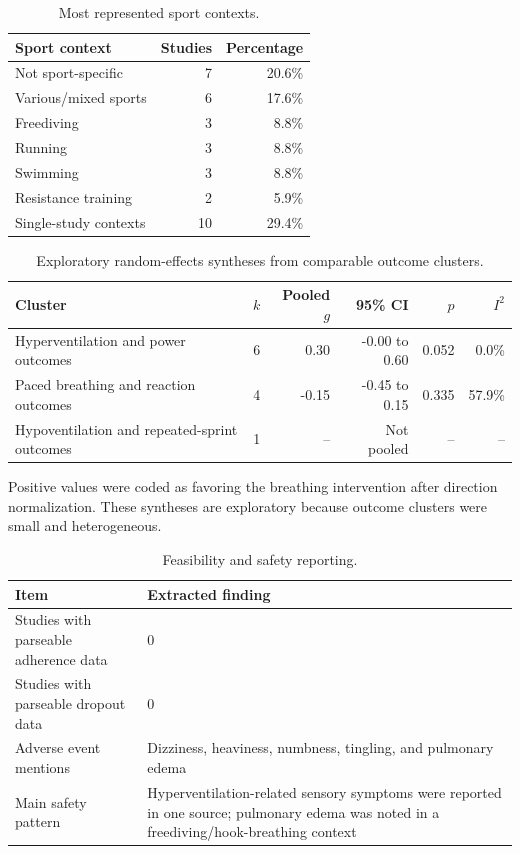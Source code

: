 \begin{table}[tbp]
\centering
\caption{Most represented sport contexts.}
\label{tab:sports}
\begin{tabular}{@{}lrr@{}}
\toprule
Sport context & Studies & Percentage \\
\midrule
Not sport-specific & 7 & 20.6\% \\
Various/mixed sports & 6 & 17.6\% \\
Freediving & 3 & 8.8\% \\
Running & 3 & 8.8\% \\
Swimming & 3 & 8.8\% \\
Resistance training & 2 & 5.9\% \\
Single-study contexts & 10 & 29.4\% \\
\bottomrule
\end{tabular}
\end{table}

\begin{table}[tbp]
\centering
\caption{Exploratory random-effects syntheses from comparable outcome clusters.}
\label{tab:meta}
\begin{tabular}{@{}lrrrrr@{}}
\toprule
Cluster & $k$ & Pooled $g$ & 95\% CI & $p$ & $I^2$ \\
\midrule
Hyperventilation and power outcomes & 6 & 0.30 & -0.00 to 0.60 & 0.052 & 0.0\% \\
Paced breathing and reaction outcomes & 4 & -0.15 & -0.45 to 0.15 & 0.335 & 57.9\% \\
Hypoventilation and repeated-sprint outcomes & 1 & -- & Not pooled & -- & -- \\
\bottomrule
\end{tabular}

\vspace{1mm}
\parbox{0.92\textwidth}{\footnotesize Positive values were coded as favoring the breathing intervention after direction normalization. These syntheses are exploratory because outcome clusters were small and heterogeneous.}
\end{table}

\begin{table}[tbp]
\centering
\caption{Feasibility and safety reporting.}
\label{tab:feasibility}
\begin{tabularx}{\textwidth}{@{}lX@{}}
\toprule
Item & Extracted finding \\
\midrule
Studies with parseable adherence data & 0 \\
Studies with parseable dropout data & 0 \\
Adverse event mentions & Dizziness, heaviness, numbness, tingling, and pulmonary edema \\
Main safety pattern & Hyperventilation-related sensory symptoms were reported in one source; pulmonary edema was noted in a freediving/hook-breathing context \\
\bottomrule
\end{tabularx}
\end{table}

